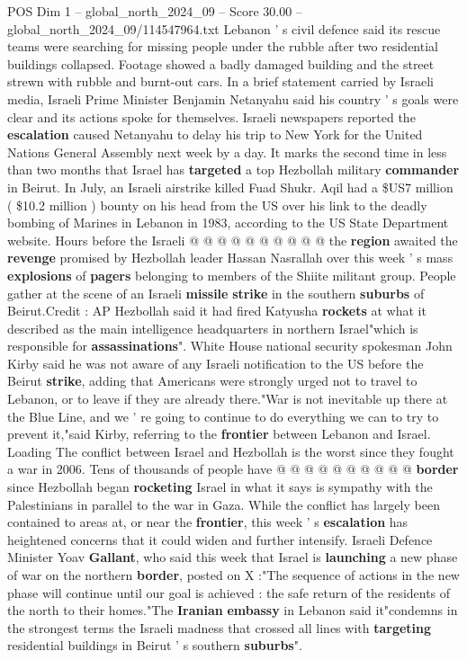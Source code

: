 \begin{textsample}{POS Dim 1 – global\_north\_2024\_09 – Score 30.00 – global\_north\_2024\_09/114547964.txt}
Lebanon ' s civil defence said its rescue teams were searching for missing people under the rubble after two residential buildings collapsed.
Footage showed a badly damaged building and the street strewn with rubble and burnt-out cars.
In a brief statement carried by Israeli media, Israeli Prime Minister Benjamin Netanyahu said his country ' s goals were clear and its actions spoke for themselves.
Israeli newspapers reported the \textbf{escalation} caused Netanyahu to delay his trip to New York for the United Nations General Assembly next week by a day.
It marks the second time in less than two months that Israel has \textbf{targeted} a top Hezbollah military \textbf{commander} in Beirut.
In July, an Israeli airstrike killed Fuad Shukr.
Aqil had a \$US7 million ( \$10.2 million ) bounty on his head from the US over his link to the deadly bombing of Marines in Lebanon in 1983, according to the US State Department website.
Hours before the Israeli @ @ @ @ @ @ @ @ @ @ the \textbf{region} awaited the \textbf{revenge} promised by Hezbollah leader Hassan Nasrallah over this week ' s mass \textbf{explosions} of \textbf{pagers} belonging to members of the Shiite militant group.
People gather at the scene of an Israeli \textbf{missile} \textbf{strike} in the southern \textbf{suburbs} of Beirut.Credit : AP Hezbollah said it had fired Katyusha \textbf{rockets} at what it described as the main intelligence headquarters in northern Israel"which is responsible for \textbf{assassinations}".
White House national security spokesman John Kirby said he was not aware of any Israeli notification to the US before the Beirut \textbf{strike}, adding that Americans were strongly urged not to travel to Lebanon, or to leave if they are already there."War is not inevitable up there at the Blue Line, and we ' re going to continue to do everything we can to try to prevent it,"said Kirby, referring to the \textbf{frontier} between Lebanon and Israel.
Loading The conflict between Israel and Hezbollah is the worst since they fought a war in 2006.
Tens of thousands of people have @ @ @ @ @ @ @ @ @ @ \textbf{border} since Hezbollah began \textbf{rocketing} Israel in what it says is sympathy with the Palestinians in parallel to the war in Gaza.
While the conflict has largely been contained to areas at, or near the \textbf{frontier}, this week ' s \textbf{escalation} has heightened concerns that it could widen and further intensify.
Israeli Defence Minister Yoav \textbf{Gallant}, who said this week that Israel is \textbf{launching} a new phase of war on the northern \textbf{border}, posted on X :"The sequence of actions in the new phase will continue until our goal is achieved : the safe return of the residents of the north to their homes."The \textbf{Iranian} \textbf{embassy} in Lebanon said it"condemns in the strongest terms the Israeli madness that crossed all lines with \textbf{targeting} residential buildings in Beirut ' s southern \textbf{suburbs}".

\end{textsample}

